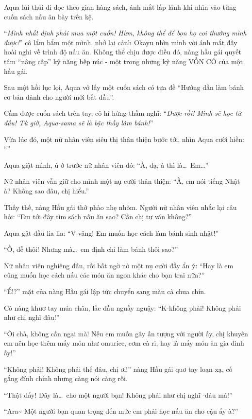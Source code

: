 \documentclass[../main.tex]{subfiles}
\begin{document}
Aqua lủi thủi đi dọc theo gian hàng sách, ánh mắt lấp lánh khi nhìn vào từng cuốn sách nấu ăn bày trên kệ.

``\textit{Mình nhất định phải mua một cuốn! Hừm, không thể để bọn họ coi thường mình được!}'' cô lẩm bẩm một mình, nhớ lại cảnh Okayu nhìn mình với ánh mắt đầy hoài nghi về trình độ nấu ăn. Không thể chịu được điều đó, nàng hầu gái quyết tâm ``nâng cấp'' kỹ năng bếp núc - một trong những kỹ năng VỐN CÓ của một hầu gái.

Sau một hồi lục lọi, Aqua vớ lấy một cuốn sách có tựa đề ``Hướng dẫn làm bánh cơ bản dành cho người mới bắt đầu''.

Cầm được cuốn sách trên tay, cô hí hửng thầm nghĩ: ``\textit{Được rồi! Mình sẽ học từ đầu! Từ giờ, Aqua-sama sẽ là bậc thầy làm bánh!}''

Vừa lúc đó, một nữ nhân viên siêu thị thân thiện bước tới, nhìn Aqua cười hiền: ``''

Aqua giật mình, ú ớ trước nữ nhân viên đó: ``À, dạ, à thì là\dots\ Em\dots''

Nữ nhân viên vẫn giữ cho mình một nụ cười thân thiện: ``À, em nói tiếng Nhật à? Không sao đâu, chị hiểu.''

Thấy thế, nàng Hầu gái thở phào nhẹ nhõm. Người nữ nhân viên nhắc lại câu hỏi: ``Em tới đây tìm sách nấu ăn sao? Cần chị tư ván không?''

Aqua gật đầu lia lịa: ``V-vâng! Em muốn học cách làm bánh sinh nhật!''

``Ồ, dễ thôi! Nhưng mà\dots\ em định chỉ làm bánh thôi sao?''

Nữ nhân viên nghiêng đầu, rồi bất ngờ nở một nụ cười đầy ẩn ý: ``Hay là em cũng muốn học cách nấu các món ăn ngon khác cho bạn trai nữa?''

``Ể!?'' mặt của nàng Hầu gái lập tức chuyển sang màu cà chua chín.

Cô nàng khươ tay múa chân, lắc đầu nguầy nguậy: ``K-không phải! Không phải như chị nghĩ đâu!''

``Ôi chà, không cần ngại mà! Nếu em muốn gây ấn tượng với người ấy, chị khuyên em nên học thêm mấy món như omurice, cơm cà ri, hay là mấy món ăn gia đình ấy!''

``Không phải! Không phải thế đâu, chị ơi!'' nàng Hầu gái quơ tay loạn xạ, cố gắng đính chính nhưng càng nói càng rối.

``Thật đấy! Đây là\dots\ cho một người bạn! Không phải như chị nghĩ -đâu mà!''

``Ara\~{} Một người bạn quan trọng đến mức em phải học nấu ăn cho cậu ấy à?''
\end{document}
